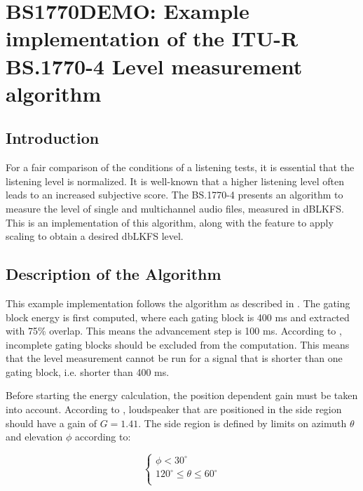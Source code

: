 
\chapter{BS1770DEMO: Example implementation of the ITU-R BS.1770-4 Level measurement algorithm}

\section{Introduction}

For a fair comparison of the conditions of a listening tests, it is essential
that the listening level is normalized. It is well-known that a higher listening
level often leads to an increased subjective score. The BS.1770-4 presents an algorithm
to measure the level of single and multichannel audio files, measured in dBLKFS. 
This is an implementation of this algorithm, along with the feature to apply scaling 
to obtain a desired dbLKFS level.

\section{Description of the Algorithm}

This example implementation follows the algorithm as described in \cite{BS1770}. The gating block
energy is first computed, where each gating block is 400 ms and extracted with 75\% overlap. This
means the advancement step is 100 ms. According to \cite{BS1770}, incomplete gating blocks should
be excluded from the computation. This means that the level measurement cannot be run for a signal
that is shorter than one gating block, i.e. shorter than 400 ms.

Before starting the energy calculation, the position dependent gain must be taken into account. 
According to \cite{BS1770}, loudspeaker that are positioned in the side region should have a gain
of $G=1.41$. The side region is defined by limits on azimuth $\theta$ and elevation $\phi$ according to:

  \[
    \left\{
       \begin{array}{ll}
         \phi < 30 ^{\circ} \\
         120 ^{\circ} \leq \theta \leq 60 ^{\circ} \\
       \end{array}
     \right.
  \]  

